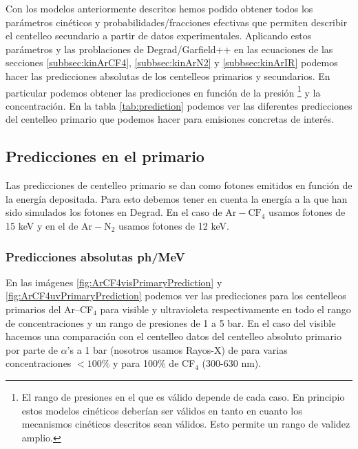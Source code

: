\documentclass[12pt,a4paper]{article}
\newcommand{\N}{\mathrm{N}}
\newcommand{\Ar}{\mathrm{Ar}}
\newcommand{\CF}{\mathrm{CF}}
\begin{document}
Con los modelos anteriormente descritos hemos podido obtener todos los parámetros cinéticos y probabilidades/fracciones efectivas que permiten describir el centelleo secundario a partir de datos experimentales. Aplicando estos parámetros y las problaciones de Degrad/Garfield++ en las ecuaciones de las secciones \ref{subbsec:kinArCF4}, \ref{subbsec:kinArN2} y \ref{subbsec:kinArIR} podemos hacer las predicciones absolutas de los centelleos primarios y secundarios. En particular podemos obtener las predicciones en función de la presión \footnote{El rango de presiones en el que es válido depende de cada caso. En principio estos modelos cinéticos deberían ser válidos en tanto en cuanto los mecanismos cinéticos descritos sean válidos. Esto permite un rango de validez amplio.} y la concentración. En la tabla \ref{tab:prediction} podemos ver las diferentes predicciones del centelleo primario que podemos hacer para emisiones concretas de interés. 



%

\subsection{Predicciones en el primario}

Las predicciones de centelleo primario se dan como fotones emitidos en función de la energía depositada. Para esto debemos tener en cuenta la energía a la que han sido simulados los fotones en Degrad. En el caso de $\Ar-\CF_4$ usamos fotones de 15 keV y en el de $\Ar-\N_2$ usamos fotones de 12 keV. 

\subsubsection{Predicciones absolutas ph/MeV} 

En las imágenes \ref{fig:ArCF4visPrimaryPrediction} y \ref{fig:ArCF4uvPrimaryPrediction} podemos ver las predicciones para los centelleos primarios del Ar--CF$_4$ para visible y ultravioleta respectivamente en todo el rango de concentraciones y un rango de presiones de 1 a 5 bar. En el caso del visible hacemos una comparación con el centelleo datos del centelleo absoluto primario por parte de $\alpha$'s a 1 bar (nosotros usamos Rayos-X) de \cite{amedo2023observation} para varias concentraciones $<100\%$ y \cite{lehaut2015scintillation} para 100\% de CF$_4$ (300-630 nm).
\end{document}
